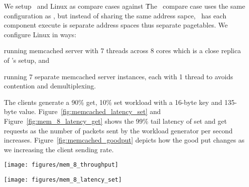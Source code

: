 We setup \cos\ and Linux as compare cases against \name\. 
The \cos\ compare case uses the same configuration as \name , but instead of sharing the same address sapce, \cos\ has each component execute is separate address spaces thus separate pagetables.
We configure Linux in ways:
\begin{inparaenum}[(1)]
\item running memcached server with 7 threads across 8 cores which is a close replica of \name 's setup, and
\item running 7 separate memcached server instances, each with 1 thread to avoids contention and demultiplexing.
\end{inparaenum}
The clients generate a 90\% get, 10\% set workload with a 16-byte key and 135-byte value. 
Figure~\ref{fig:memcached_latency_set} and Figure~\ref{fig:mem_8_latency_get} shows the 99\% tail latency of set and get requests as the number of packets sent by the workload generator per second increases.
Figure~\ref{fig:memcached_goodput} depicts how the good put changes as we increasing the client sending rate.

\begin{figure*}[t]
    \centering
    \begin{minipage}[b]{0.45\textwidth}
        \texttt{[image: figures/mem\_8\_throughput]}
        \caption{Goodput Comparison}
	\label{fig:memcached_latency_set}
    \end{minipage}
    \begin{minipage}[b]{0.45\textwidth}
        \texttt{[image: figures/mem\_8\_latency\_set]}
        \caption{99th Percentile Latency of Requests}
	\label{fig:memcached_latency_set}
    \end{minipage}
\end{figure*}


